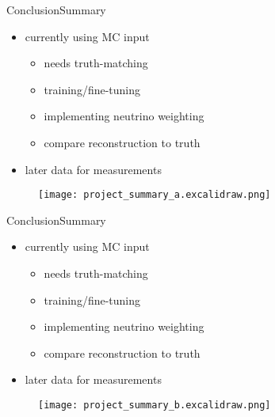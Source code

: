 \documentclass[9pt, aspectratio=169]{beamer}
\begin{document}
\begin{frame}{Conclusion}{Summary}
	\begin{itemize}
		\item currently using MC input  
		\begin{itemize}
			\item needs truth-matching
			\item training/fine-tuning \spanet
			\item implementing neutrino weighting
			\item compare reconstruction to truth
		\end{itemize}
		\item later data for measurements
	\end{itemize}

	\begin{figure}
		\centering
		\texttt{[image: project\_summary\_a.excalidraw.png]}
	\end{figure}
\end{frame}

\addtocounter{framenumber}{-1} 

\begin{frame}{Conclusion}{Summary}
	\begin{itemize}
		\item currently using MC input  
		\begin{itemize}
			\item needs truth-matching
			\item training/fine-tuning \spanet
			\item implementing neutrino weighting
			\item compare reconstruction to truth
		\end{itemize}
		\item later data for measurements
	\end{itemize}

	\begin{figure}
		\centering
		\texttt{[image: project\_summary\_b.excalidraw.png]}
	\end{figure}
\end{frame}
\end{document}
